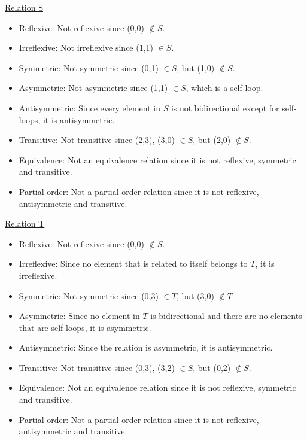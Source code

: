 \underline{Relation S}
\begin{itemize}
    \item Reflexive: Not reflexive since (0,0) $\notin S$.
    \item Irreflexive: Not irreflexive since (1,1) $\in S$.
    \item Symmetric: Not symmetric since (0,1) $\in S$, but (1,0) $\notin S$.
    \item Asymmetric: Not asymmetric since (1,1) $\in S$, which is a self-loop.
    \item Antisymmetric: Since every element in $S$ is not bidirectional except for self-loops, it is antisymmetric.
    \item Transitive: Not transitive since (2,3), (3,0) $\in S$, but (2,0) $\notin S$.
    \item Equivalence: Not an equivalence relation since it is not reflexive, symmetric and transitive.
    \item Partial order: Not a partial order relation since it is not reflexive, antisymmetric and transitive.
\end{itemize}

\underline{Relation T}
\begin{itemize}
    \item Reflexive: Not reflexive since (0,0) $\notin S$.
    \item Irreflexive: Since no element that is related to itself belongs to $T$, it is irreflexive.
    \item Symmetric: Not symmetric since (0,3) $\in T$, but (3,0) $\notin T$.
    \item Asymmetric: Since no element in $T$ is bidirectional and there are no elements that are self-loops, it is asymmetric. 
    \item Antisymmetric: Since the relation is asymmetric, it is antisymmetric.
    \item Transitive: Not transitive since (0,3), (3,2) $\in S$, but (0,2) $\notin S$.
    \item Equivalence: Not an equivalence relation since it is not reflexive, symmetric and transitive.
    \item Partial order: Not a partial order relation since it is not reflexive, antisymmetric and transitive.
\end{itemize}

